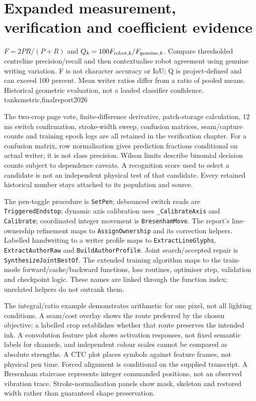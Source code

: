 \chapter{Expanded measurement, verification and coefficient evidence}
\label{ch:expand-verification}
{$F=2PR/(P+R)$ and $Q_k=100F_{{\rm robot},k}/F_{{\rm genuine},k}$.}
{Compare thresholded centreline precision/recall and then contextualise robot
agreement using genuine writing variation. F is not character accuracy or IoU;
Q is project-defined and can exceed 100 percent. Mean writer ratios differ
from a ratio of pooled means.}
{Historical geometric evaluation, not a loaded classifier confidence.}
{tanksmetric,finalreport2026}


The two-crop page vote, finite-difference derivative, patch-storage calculation,
12 ms switch confirmation, stroke-width sweep, confusion matrices, seam/capture
counts and training epoch logs are all retained in the verification chapter.
For a confusion matrix, row normalisation gives prediction fractions conditional
on actual writer; it is not class precision. Wilson limits describe binomial
decision counts subject to dependence caveats. A recognition score used to
select a candidate is not an independent physical test of that candidate.
Every retained historical number stays attached to its population and source.


The pen-toggle procedure is \texttt{SetPen}; debounced switch reads are
\texttt{TriggeredEndstop}; dynamic axis calibration uses
\texttt{\_CalibrateAxis} and \texttt{Calibrate}; coordinated integer movement
is \texttt{BresenhamMove}. The report's line-ownership refinement maps to
\texttt{AssignOwnership} and its correction helpers. Labelled handwriting to
a writer profile maps to \texttt{ExtractLineGlyphs},
\texttt{ExtractAuthorRaw} and \texttt{BuildAuthorProfile}.
Joint search/accepted repair is \texttt{SynthesizeJointBestOf}. The extended
training algorithm maps to the train-mode forward/cache/backward functions,
loss routines, optimiser step, validation and checkpoint logic. These names
are linked through the function index; unrelated helpers do not outrank them.

The integral/ratio example demonstrates arithmetic for one pixel, not all
lighting conditions. A seam/cost overlay shows the route preferred by the
chosen objective; a labelled crop establishes whether that route preserves
the intended ink. A convolution feature plot shows activation responses,
not fixed semantic labels for channels, and independent colour scales cannot
be compared as absolute strengths. A CTC plot places symbols against feature
frames, not physical pen time. Forced alignment is conditional on the supplied
transcript. A Bresenham staircase represents integer commanded positions,
not an observed vibration trace. Stroke-normalisation panels show mask,
skeleton and restored width rather than guaranteed shape preservation.

